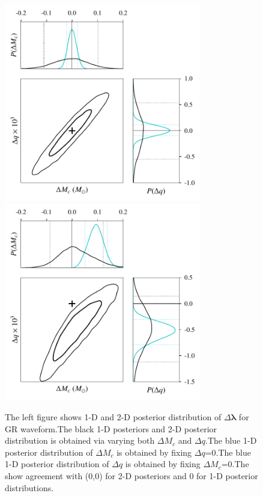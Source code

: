 \documentclass[prl,preprintnumbers,twocolumn,eqsecnum,floatfix,a4paper,nofootinbib,superscriptaddress]{revtex4}
\newcommand{\blambda}{\bm{\lambda}}
\begin{document}
\begin{figure}[htb] \begin{center}
\includegraphics[width=3.4in]{figs/fig1_GR.pdf}
\includegraphics[width=3.4in]{figs/fig1_modGR.pdf}
\caption{The left figure shows 1-D and 2-D posterior distribution of $\Delta \blambda$ for GR waveform.The black 1-D posteriors and 2-D posterior distribution is obtained via varying both $\Delta M_c$ and $\Delta q$.The blue 1-D posterior distribution of $\Delta M_c$  is obtained by fixing $\Delta q$=0.The blue 1-D posterior distribution of $\Delta q$  is obtained by fixing $\Delta M_c$=0.The show agreement with (0,0) for 2-D posteriors and 0 for 1-D posterior distributions.}
\label{fig:contour_plots}
\end{center} \end{figure}
\end{document}
